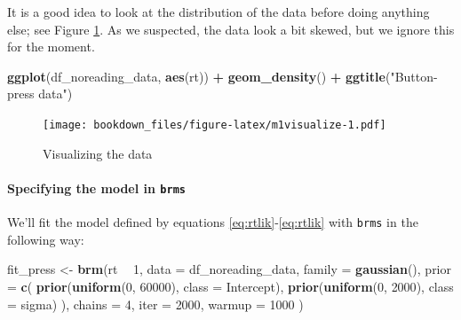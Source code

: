 \documentclass[12pt,]{krantz}
\newenvironment{Shaded}{\begin{snugshade}}{\end{snugshade}}
\newcommand{\DataTypeTok}[1]{\textcolor[rgb]{0.13,0.29,0.53}{#1}}
\newcommand{\DecValTok}[1]{\textcolor[rgb]{0.00,0.00,0.81}{#1}}
\newcommand{\KeywordTok}[1]{\textcolor[rgb]{0.13,0.29,0.53}{\textbf{#1}}}
\newcommand{\NormalTok}[1]{#1}
\newcommand{\OperatorTok}[1]{\textcolor[rgb]{0.81,0.36,0.00}{\textbf{#1}}}
\newcommand{\StringTok}[1]{\textcolor[rgb]{0.31,0.60,0.02}{#1}}
\let\oldparagraph\paragraph
\renewcommand{\paragraph}[1]{\oldparagraph{#1}\mbox{}}
\theoremstyle{definition}
\theoremstyle{definition}
\theoremstyle{definition}
\theoremstyle{remark}
\begin{document}
It is a good idea to look at the distribution of the data before doing anything else; see Figure \ref{fig:m1visualize}. As we suspected, the data look a bit skewed, but we ignore this for the moment.

\begin{Shaded}
\begin{Highlighting}[]
\KeywordTok{ggplot}\NormalTok{(df_noreading_data, }\KeywordTok{aes}\NormalTok{(rt)) }\OperatorTok{+}
\StringTok{  }\KeywordTok{geom_density}\NormalTok{() }\OperatorTok{+}
\StringTok{  }\KeywordTok{ggtitle}\NormalTok{(}\StringTok{"Button-press data"}\NormalTok{)}
\end{Highlighting}
\end{Shaded}

\begin{figure}
\centering
\texttt{[image: bookdown\_files/figure-latex/m1visualize-1.pdf]}
\caption{\label{fig:m1visualize}Visualizing the data}
\end{figure}

\hypertarget{specifying-the-model-in-brms}{%
\paragraph{\texorpdfstring{Specifying the model in \texttt{brms}}{Specifying the model in brms}}\label{specifying-the-model-in-brms}}

We'll fit the model defined by equations \eqref{eq:rtlik}-\eqref{eq:rtlik} with \texttt{brms} in the following way:

\begin{Shaded}
\begin{Highlighting}[]
\NormalTok{fit_press <-}\StringTok{ }\KeywordTok{brm}\NormalTok{(rt }\OperatorTok{~}\StringTok{ }\DecValTok{1}\NormalTok{,}
  \DataTypeTok{data =}\NormalTok{ df_noreading_data,}
  \DataTypeTok{family =} \KeywordTok{gaussian}\NormalTok{(),}
  \DataTypeTok{prior =} \KeywordTok{c}\NormalTok{(}
    \KeywordTok{prior}\NormalTok{(}\KeywordTok{uniform}\NormalTok{(}\DecValTok{0}\NormalTok{, }\DecValTok{60000}\NormalTok{), }\DataTypeTok{class =}\NormalTok{ Intercept),}
    \KeywordTok{prior}\NormalTok{(}\KeywordTok{uniform}\NormalTok{(}\DecValTok{0}\NormalTok{, }\DecValTok{2000}\NormalTok{), }\DataTypeTok{class =}\NormalTok{ sigma)}
\NormalTok{  ),}
  \DataTypeTok{chains =} \DecValTok{4}\NormalTok{,}
  \DataTypeTok{iter =} \DecValTok{2000}\NormalTok{,}
  \DataTypeTok{warmup =} \DecValTok{1000}
\NormalTok{)}
\end{Highlighting}
\end{Shaded}
\end{document}

